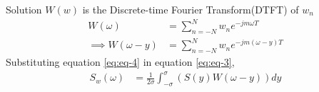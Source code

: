 \documentclass{beamer}
\providecommand{\brak}[1]{\ensuremath{\left(#1\right)}}
\begin{document}
\begin{frame}{Solution}
    $W\brak{w}$ is the Discrete-time Fourier Transform(DTFT) of $w_n$
    \begin{align}
        W\brak{\omega} &=\sum_{n=-N}^{N}w_ne^{-jm\omega T}
        \\
        \implies W\brak{\omega-y} &=\sum_{n=-N}^{N}w_ne^{-jm(\omega-y)T}
        \label{eq:eq-4}
    \end{align}
    Substituting equation \eqref{eq:eq-4} in equation \eqref{eq:eq-3},
    \begin{align}
        S_w\brak{\omega} &= \frac{1}{2\sigma} \int^{\sigma}_{-\sigma}\brak{S\brak{y}W(\omega-y)}dy
    \end{align}
\end{frame}
\end{document}

